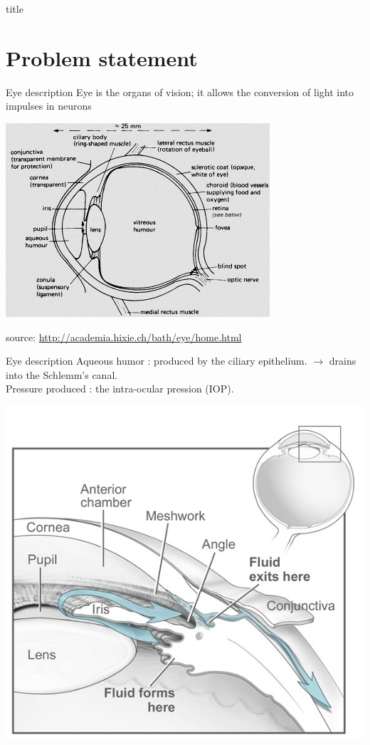 

\begin{frame}{}
 title
\end{frame}

\section{Problem statement}
\frame{\sectionpage}
\begin{frame}{Eye description}
Eye is the organs of vision; it allows the conversion of light into impulses in neurons
\begin{center}
\includegraphics[width=.7\linewidth]{Eye.jpg}
\end{center}
\tiny{source: \url{http://academia.hixie.ch/bath/eye/home.html}}
\end{frame}

\begin{frame}{Eye description}
Aqueous humor : produced by the ciliary epithelium.
$\rightarrow$ drains into the Schlemm's canal.\\
Pressure produced : the intra-ocular pression (IOP).
\begin{center}
\includegraphics[width=.5\linewidth]{Humor.jpg}
\end{center}


\end{frame}

